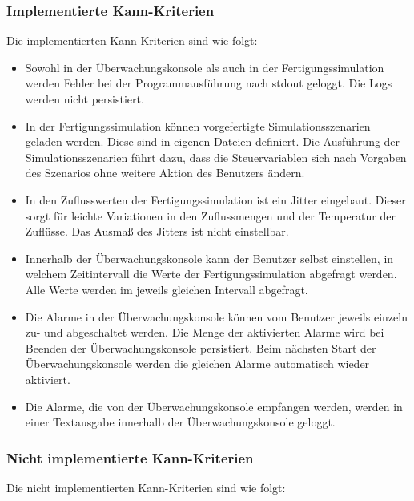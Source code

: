 \documentclass[parskip=full]{scrartcl}
\begin{document}
\subsubsection{Implementierte Kann-Kriterien}
Die implementierten Kann-Kriterien sind wie folgt:

\begin{itemize}
    \item Sowohl in der \"Uberwachungskonsole als auch in der Fertigungssimulation werden Fehler bei der Programmausf\"uhrung
    nach stdout geloggt. Die Logs werden nicht persistiert.
    \item In der Fertigungssimulation k\"onnen vorgefertigte Simulationsszenarien geladen werden. Diese sind in eigenen Dateien definiert.
    Die Ausführung der Simulationsszenarien f\"uhrt dazu, dass die Steuervariablen sich nach Vorgaben des Szenarios ohne
    weitere Aktion des Benutzers \"andern.
    \item In den Zuflusswerten der Fertigungssimulation ist ein Jitter eingebaut. Dieser sorgt f\"ur leichte Variationen in den
    Zuflussmengen und der Temperatur der Zufl\"usse. Das Ausma{\ss} des Jitters ist nicht einstellbar.
    \item Innerhalb der \"Uberwachungskonsole kann der Benutzer selbst einstellen, in welchem Zeitintervall die Werte der
    Fertigungssimulation abgefragt werden. Alle Werte werden im jeweils gleichen Intervall abgefragt.
    \item Die Alarme in der \"Uberwachungskonsole k\"onnen vom Benutzer jeweils einzeln zu- und abgeschaltet werden. Die Menge der
    aktivierten Alarme wird bei Beenden der \"Uberwachungskonsole persistiert. Beim n\"achsten Start der \"Uberwachungskonsole
    werden die gleichen Alarme automatisch wieder aktiviert.
    \item Die Alarme, die von der \"Uberwachungskonsole empfangen werden, werden in einer Textausgabe innerhalb der
    \"Uberwachungskonsole geloggt.
\end{itemize}

\subsubsection{Nicht implementierte Kann-Kriterien}
Die nicht implementierten Kann-Kriterien sind wie folgt:
\end{document}
